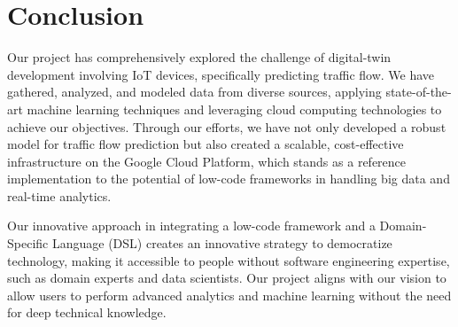 \section{Conclusion}

 Our project has comprehensively explored the challenge of digital-twin development involving IoT devices, specifically predicting traffic flow. We have gathered, analyzed, and modeled data from diverse sources, applying state-of-the-art machine learning techniques and leveraging cloud computing technologies to achieve our objectives. Through our efforts, we have not only developed a robust model for traffic flow prediction but also created a scalable, cost-effective infrastructure on the Google Cloud Platform, which stands as a reference implementation to the potential of low-code frameworks in handling big data and real-time analytics.

Our innovative approach in integrating a low-code framework and a Domain-Specific Language (DSL) creates an innovative strategy to democratize technology, making it accessible to people without software engineering expertise, such as domain experts and data scientists. Our project aligns with our vision to allow users to perform advanced analytics and machine learning without the need for deep technical knowledge.

